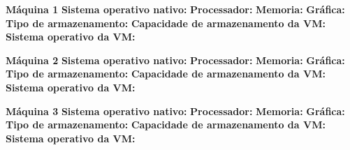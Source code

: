 \textbf{Máquina 1}
\textbf{Sistema operativo nativo:} \textit{}
\textbf{Processador:} \textit{}
\textbf{Memoria:} \textit{}
\textbf{Gráfica:} \textit{}
\textbf{Tipo de armazenamento:} \textit{}
\textbf{Capacidade de armazenamento da VM:} \textit{}
\textbf{Sistema operativo da VM:} \textit{}

\textbf{Máquina 2}
\textbf{Sistema operativo nativo:} \textit{}
\textbf{Processador:} \textit{}
\textbf{Memoria:} \textit{}
\textbf{Gráfica:} \textit{}
\textbf{Tipo de armazenamento:} \textit{}
\textbf{Capacidade de armazenamento da VM:} \textit{}
\textbf{Sistema operativo da VM:} \textit{}

\textbf{Máquina 3}
\textbf{Sistema operativo nativo:} \textit{}
\textbf{Processador:} \textit{}
\textbf{Memoria:} \textit{}
\textbf{Gráfica:} \textit{}
\textbf{Tipo de armazenamento:} \textit{}
\textbf{Capacidade de armazenamento da VM:} \textit{}
\textbf{Sistema operativo da VM:} \textit{}
